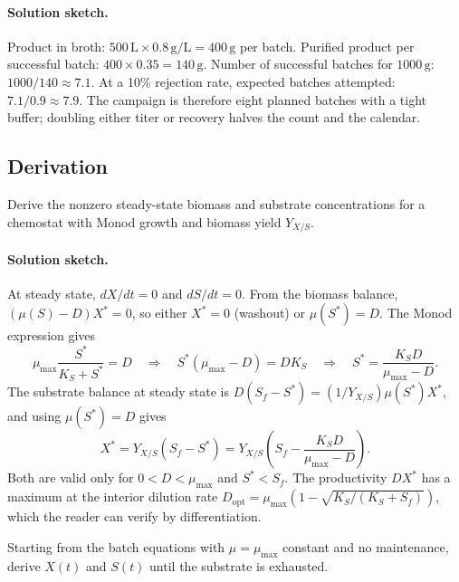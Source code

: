 \paragraph{Solution sketch.}
Product in broth: $500\,\text{L} \times 0.8\,\text{g}/\text{L} =
400\,\text{g}$ per batch. Purified product per successful batch:
$400 \times 0.35 = 140\,\text{g}$. Number of successful batches for
$1000\,\text{g}$: $1000/140 \approx 7.1$. At a 10\% rejection rate,
expected batches attempted: $7.1 / 0.9 \approx 7.9$. The campaign is
therefore eight planned batches with a tight buffer; doubling either
titer or recovery halves the count and the calendar.

\subsection*{Derivation}

\begin{exercise}
Derive the nonzero steady-state biomass and substrate concentrations
for a chemostat with Monod growth and biomass yield $Y_{X/S}$.
\end{exercise}

\paragraph{Solution sketch.}
At steady state, $dX/dt = 0$ and $dS/dt = 0$. From the biomass balance,
$(\mu(S) - D) X^\ast = 0$, so either $X^\ast = 0$ (washout) or
$\mu(S^\ast) = D$. The Monod expression gives
\[
\mu_{\max} \frac{S^\ast}{K_S + S^\ast} = D
\quad\Rightarrow\quad
S^\ast(\mu_{\max} - D) = D K_S
\quad\Rightarrow\quad
S^\ast = \frac{K_S D}{\mu_{\max} - D}.
\]
The substrate balance at steady state is
$D(S_f - S^\ast) = (1/Y_{X/S})\mu(S^\ast) X^\ast$, and using
$\mu(S^\ast) = D$ gives
\[
X^\ast = Y_{X/S}(S_f - S^\ast)
       = Y_{X/S}\left(S_f - \frac{K_S D}{\mu_{\max} - D}\right).
\]
Both are valid only for $0 < D < \mu_{\max}$ and $S^\ast < S_f$. The
productivity $D X^\ast$ has a maximum at the interior dilution rate
$D_{\text{opt}} = \mu_{\max}(1 - \sqrt{K_S/(K_S + S_f)})$, which the
reader can verify by differentiation.

\begin{exercise}
Starting from the batch equations with $\mu=\mu_{\max}$ constant and no
maintenance, derive $X(t)$ and $S(t)$ until the substrate is exhausted.
\end{exercise}

